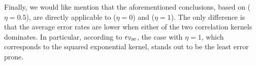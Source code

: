 Finally, we would like mention that the aforementioned conclusions, based on  ($\eta = 0.5$), are directly applicable to  ($\eta = 0$) and  ($\eta = 1$).
The only difference is that the average error rates are lower when either of the two correlation kernels dominates.
In particular, according to $\epsilon_{\mathbb{V}\text{ar}}$, the case with $\eta = 1$, which corresponds to the squared exponential kernel, stands out to be the least error prone.
